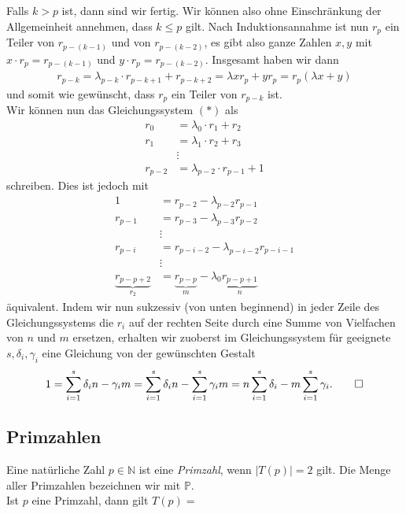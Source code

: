 Falls $k>p$ ist, dann sind wir fertig. Wir können also ohne Einschränkung der Allgemeinheit annehmen, dass $k\leq p$ gilt. Nach Induktionsannahme ist nun $r_p$ ein Teiler von $r_{p-(k-1)}$ und von $r_{p-(k-2)}$, es gibt also ganze Zahlen $x,y$ mit $x\cdot r_p=r_{p-(k-1)}$ und $y\cdot r_p=r_{p-(k-2)}$. Insgesamt haben wir dann
\begin{align*}
	r_{p-k}=\lambda_{p-k}\cdot r_{p-k+1}+r_{p-k+2}=\lambda xr_{p}+yr_{p}=r_{p}(\lambda x+y)
\end{align*}
und somit wie gewünscht, dass $r_p$ ein Teiler von $r_{p-k}$ ist.\\
Wir können nun das Gleichungssystem $(*)$ als
\begin{align*}
	r_0     & =\lambda_0\cdot r_1+r_2       \\
	r_1     & =\lambda_1\cdot r_2+r_3       \\
	        & \vdots                        \\
	r_{p-2} & =\lambda_{p-2}\cdot r_{p-1}+1
\end{align*}
schreiben. Dies ist jedoch mit
\begin{align*}
	1                            & =r_{p-2}-\lambda_{p-2}r_{p-1}                                   \\
	r_{p-1}                      & =r_{p-3}-\lambda_{p-3}r_{p-2}                                   \\
	                             & \vdots                                                          \\
	r_{p-i}                      & =r_{p-i-2}-\lambda_{p-i-2}r_{p-i-1}                             \\
	                             & \vdots                                                          \\
	\underbrace{r_{p-p+2}}_{r_2} & =\underbrace{r_{p-p}}_{m}-\lambda_{0}\underbrace{r_{p-p+1}}_{n}
\end{align*}
äquivalent. Indem wir nun sukzessiv (von unten beginnend) in jeder Zeile des Gleichungssystems die $r_i$ auf der rechten Seite durch eine Summe von Vielfachen von $n$ und $m$ ersetzen, erhalten wir zuoberst im Gleichungssystem für geeignete $s,\delta_i,\gamma_i$ eine Gleichung von der gewünschten Gestalt
\[
	1=\sum_{i=1}^{s}\delta_in-\gamma_im=\sum_{i=1}^{s}\delta_in-\sum_{i=1}^{s}\gamma_im=n\sum_{i=1}^{s}\delta_i-m\sum_{i=1}^{s}\gamma_i.\qedhere
\]

\subsection{Primzahlen}

Eine natürliche Zahl $p \in \mathbb{N}$ ist eine \textit{Primzahl}, wenn $|T(p)|=2$ gilt. Die Menge aller Primzahlen bezeichnen wir mit $\mathbb{P}$. \\
Ist $p$ eine Primzahl, dann gilt $T(p)=$ \\

